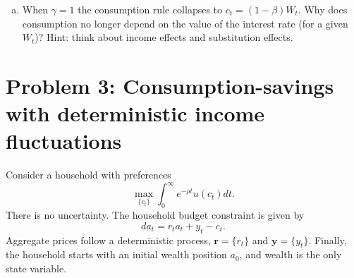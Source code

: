 \documentclass[11pt]{extarticle}
\theoremstyle{plain}
\theoremstyle{definition}
\begin{document}
\begin{enumerate}[(a)]
\item When $\gamma = 1$ the consumption rule collapses to $c_t = (1-\beta) W_t$. Why does consumption no longer depend on the value of the interest rate (for a given $W_t$)? Hint: think about income effects and substitution effects.
\end{enumerate}




\vspace{5mm}
\section*{Problem 3: Consumption-savings with deterministic income fluctuations}

Consider a household with preferences 
\begin{equation*}
	\max_{\{c_t\}} \int_0^\infty e^{- \rho t} u(c_t) dt. 
\end{equation*}
There is no uncertainty. The household budget constraint is given by
\begin{equation*}
	da_t = r_t a_t + y_t - c_t. 
\end{equation*}
Aggregate prices follow a deterministic process, $\bm{r} = \{r_t\}$ and $\bm{y} = \{y_t\}$. Finally, the household starts with an initial wealth position $a_0$, and wealth is the only state variable. 
\end{document}
